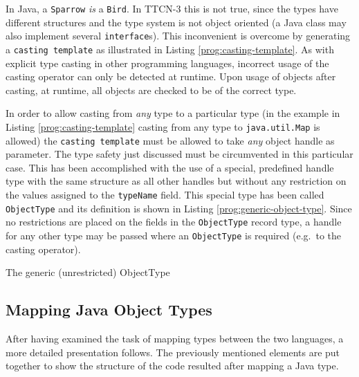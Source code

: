 In Java, a \verb=Sparrow= \emph{is} a \verb=Bird=.
In \ac{TTCN-3} this is not true, since the types have different structures
and the type system is not object oriented
(a Java class may also implement several \verb=interface=s).
This inconvenient is overcome by generating a \texttt{casting template}
as illustrated in Listing \ref{prog:casting-template}.
As with explicit type casting in other programming languages,
incorrect usage of the casting operator can only be detected at runtime.
Upon usage of objects after casting, at runtime,
all objects are checked to be of the correct type.

\begin{program}
\caption{The casting template for type \texttt{java.util.Map}%
	\label{prog:casting-template}}
\end{program}

In order to allow casting from \emph{any} type to a particular type
(in the example in Listing \ref{prog:casting-template} casting from any type
to \texttt{java.util.Map} is allowed)
the \texttt{casting template} must be allowed to take
\emph{any} object handle as parameter.
The type safety just discussed must be circumvented in this particular case.
This has been accomplished with the use of a special, predefined handle type
with the same structure as all other handles but without any restriction
on the values assigned to the \verb=typeName= field.
This special type has been called \verb=ObjectType=
and its definition is shown in Listing \ref{prog:generic-object-type}.
Since no restrictions are placed on the fields
in the \verb=ObjectType= record type,
a handle for any other type may be passed
where an \verb=ObjectType= is required (e.g.\ to the casting operator).

\begin{program}
\caption{The generic (unrestricted) ObjectType\label{prog:generic-object-type}}
\end{program}


\subsection{Mapping Java Object Types}
\label{sec:mapping-java-object-types}

After having examined the task of mapping types between the two languages,
a more detailed presentation follows.
The previously mentioned elements are put together
to show the structure of the code resulted after mapping a Java type.

